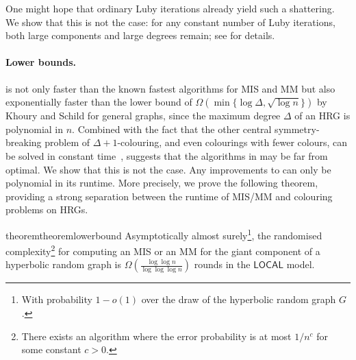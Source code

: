 \documentclass[letterpaper,11pt]{article}
\newcommand{\1}{\mathbb I}
\newcommand{\LOCAL}{\ensuremath{\mathsf{LOCAL}}\xspace}
\begin{document}
One might hope that ordinary Luby iterations already yield such a shattering. We show that this is not the case: for any constant number of Luby iterations, both large components and large degrees remain; see  for details.
%
\paragraph{Lower bounds.}  is not only faster than the known fastest algorithms for MIS and MM but also exponentially faster than the lower bound of $\Omega\left(\min\{\log \Delta, \sqrt{\log n}\}\right)$ by Khoury and Schild \cite{khoury2025round} for general graphs,  since the maximum degree $\Delta$ of an HRG is polynomial in $n$. Combined with the fact that the other central symmetry-breaking problem of $\Delta+1$-colouring, and even colourings with fewer colours, can be solved in constant time~\cite{mr-soda-26}, suggests that the algorithms in  may be far from optimal. We show that this is not the case. Any improvements to  can only be polynomial in its runtime. More precisely, we prove the following theorem, providing a strong separation between the runtime of MIS/MM and colouring problems on HRGs. 
\begin{restatable}{theorem}{theoremlowerbound}
\label{thm:lowerbound}
 Asymptotically almost surely\footnote{With probability $1-o(1)$ over the draw of the hyperbolic random graph $G$.}, the randomised complexity\footnote{There exists an algorithm where the error probability is at most $1/n^{c}$ for some constant $c>0$.} for computing an MIS or an MM for the giant component of a hyperbolic random graph is 
$\Omega\left(\frac{\log\log n}{\log\log\log n}\right)$ rounds in the \LOCAL model.
\end{restatable}
%
\end{document}
